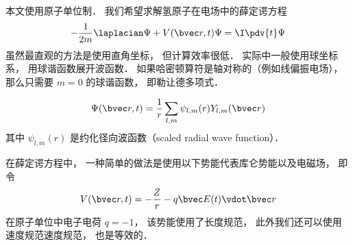 

本文使用原子单位制． 我们希望求解氢原子在电场中的薛定谔方程
\begin{equation}
-\frac{1}{2m}\laplacian \Psi + V(\bvec r, t)\Psi = \I \pdv{t}\Psi
\end{equation}
虽然最直观的方法是使用直角坐标， 但计算效率很低． 实际中一般使用球坐标系， 用球谐函数展开波函数． 如果哈密顿算符是轴对称的（例如线偏振电场）， 那么只需要 $m = 0$ 的球谐函数， 即勒让德多项式．

\begin{equation}
\Psi(\bvec r, t) = \frac{1}{r}\sum_{l,m} \psi_{l,m}(r) Y_{l,m}(\bvec r)
\end{equation}
其中 $\psi_{l,m}(r)$ 是约化径向波函数（scaled radial wave function）．

在薛定谔方程中， 一种简单的做法是使用以下势能代表库仑势能以及电磁场， 即令
\begin{equation}
V(\bvec r, t) = -\frac{Z}{r} - q\bvec E(t) \vdot \bvec r
\end{equation}
在原子单位中电子电荷 $q = -1$， 该势能使用了长度规范， 此外我们还可以使用速度规范速度规范， 也是等效的．

